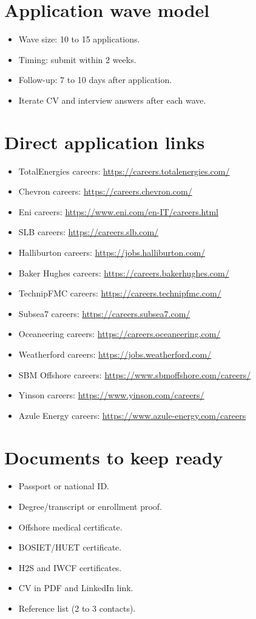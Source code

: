 \documentclass[11pt,openany]{book}
\begin{document}
\section{Application wave model}
\begin{itemize}
  \item Wave size: 10 to 15 applications.
  \item Timing: submit within 2 weeks.
  \item Follow-up: 7 to 10 days after application.
  \item Iterate CV and interview answers after each wave.
\end{itemize}

\section{Direct application links}
\begin{itemize}
  \item TotalEnergies careers: \url{https://careers.totalenergies.com/}
  \item Chevron careers: \url{https://careers.chevron.com/}
  \item Eni careers: \url{https://www.eni.com/en-IT/careers.html}
  \item SLB careers: \url{https://careers.slb.com/}
  \item Halliburton careers: \url{https://jobs.halliburton.com/}
  \item Baker Hughes careers: \url{https://careers.bakerhughes.com/}
  \item TechnipFMC careers: \url{https://careers.technipfmc.com/}
  \item Subsea7 careers: \url{https://careers.subsea7.com/}
  \item Oceaneering careers: \url{https://careers.oceaneering.com/}
  \item Weatherford careers: \url{https://jobs.weatherford.com/}
  \item SBM Offshore careers: \url{https://www.sbmoffshore.com/careers/}
  \item Yinson careers: \url{https://www.yinson.com/careers/}
  \item Azule Energy careers: \url{https://www.azule-energy.com/careers}
\end{itemize}

\section{Documents to keep ready}
\begin{itemize}
  \item Passport or national ID.
  \item Degree/transcript or enrollment proof.
  \item Offshore medical certificate.
  \item BOSIET/HUET certificate.
  \item H2S and IWCF certificates.
  \item CV in PDF and LinkedIn link.
  \item Reference list (2 to 3 contacts).
\end{itemize}
\end{document}

